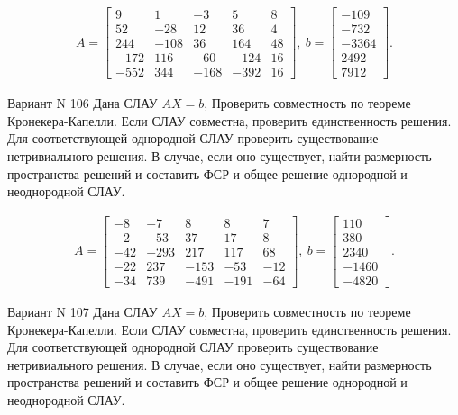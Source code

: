 \documentclass[11pt]{report}
\begin{document}
\begin{align*}
 A = \left[\begin{matrix}9 & 1 & -3 & 5 & 8\\52 & -28 & 12 & 36 & 4\\244 & -108 & 36 & 164 & 48\\-172 & 116 & -60 & -124 & 16\\-552 & 344 & -168 & -392 & 16\end{matrix}\right],
\ b = \left[\begin{matrix}-109\\-732\\-3364\\2492\\7912\end{matrix}\right]. 
 \end{align*}

Вариант N 106
Дана СЛАУ $AX = b$,
Проверить совместность по теореме Кронекера-Капелли. Если СЛАУ совместна, проверить единственность решения.
Для соответствующей однородной СЛАУ проверить существование нетривиального решения. В случае, если оно существует,
найти размерность пространства решений и составить ФСР и общее решение однородной  и неоднородной СЛАУ.


\begin{align*}
 A = \left[\begin{matrix}-8 & -7 & 8 & 8 & 7\\-2 & -53 & 37 & 17 & 8\\-42 & -293 & 217 & 117 & 68\\-22 & 237 & -153 & -53 & -12\\-34 & 739 & -491 & -191 & -64\end{matrix}\right],
\ b = \left[\begin{matrix}110\\380\\2340\\-1460\\-4820\end{matrix}\right]. 
 \end{align*}

Вариант N 107
Дана СЛАУ $AX = b$,
Проверить совместность по теореме Кронекера-Капелли. Если СЛАУ совместна, проверить единственность решения.
Для соответствующей однородной СЛАУ проверить существование нетривиального решения. В случае, если оно существует,
найти размерность пространства решений и составить ФСР и общее решение однородной  и неоднородной СЛАУ.
\end{document}
